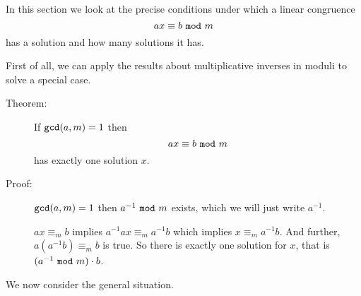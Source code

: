 \documentclass[12pt]{article}
\begin{document}
In this section we look at the precise conditions under which a linear congruence
$$ax \equiv b \,\,{\tt mod}\,\, m$$ has a solution and how many solutions it has.

First of all, we can apply the results about multiplicative inverses in moduli to solve a special case.

\begin{description}

\item[Theorem:]  If ${\tt gcd}(a,m)=1$ then $$ax \equiv b \,\,{\tt mod}\,\, m$$ has exactly one solution $x$.

\item[Proof:]   ${\tt gcd}(a,m)=1$ then $a^{-1}\,\,{\tt mod}\,\,m$ exists, which we will just write $a^{-1}$.

$ax\equiv_mb$ implies $a^{-1}ax\equiv_ma^{-1}b$ which implies $x\equiv_ma^{-1}b$.  And further, $a(a^{-1}b) \equiv_m b$ is true.  So there is exactly one solution for $x$, that is
$(a^{-1}\, \,{\tt mod}\,\, m)\cdot b$.

\end{description}

We now consider the general situation.
\end{document}
